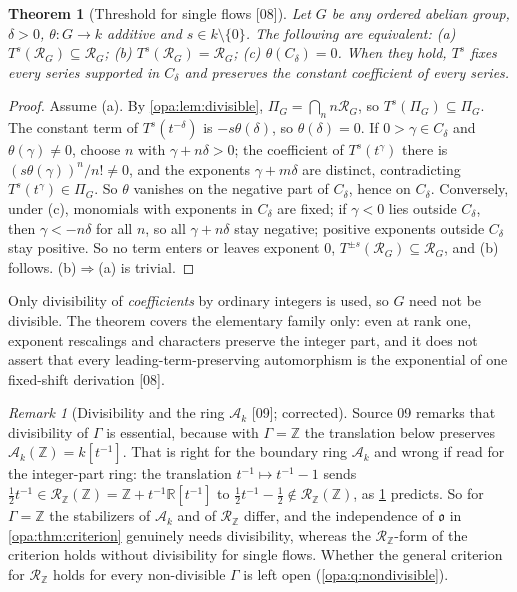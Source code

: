 \documentclass[11pt,oneside]{article}
\numberwithin{equation}{section}
\newtheorem{theorem}{Theorem}[section]
\theoremstyle{definition}
\theoremstyle{remark}
\newtheorem{remark}[remark]{Remark}
\newcommand{\R}{\mathbb R}
\newcommand{\Z}{\mathbb Z}
\newcommand{\oo}{\mathfrak o}
\newcommand{\Ak}{\mathcal A_k}
\newcommand{\src}[1]{\textup{\textsf{\small[#1]}}}
\begin{document}
\begin{theorem}[Threshold for single flows \src{08}]\label{opa:thm:threshold}
Let $G$ be any ordered abelian group, $\delta>0$, $\theta:G\to k$ additive and
$s\in k\setminus\{0\}$. The following are equivalent: \textup{(a)}
$T^s(\mathcal R_G)\subseteq\mathcal R_G$; \textup{(b)}
$T^s(\mathcal R_G)=\mathcal R_G$; \textup{(c)} $\theta(C_\delta)=0$. When they hold,
$T^s$ fixes every series supported in $C_\delta$ and preserves the constant
coefficient of every series.
\end{theorem}
\begin{proof}
Assume (a). By \cref{opa:lem:divisible}, $\Pi_G=\bigcap_nn\mathcal R_G$, so
$T^s(\Pi_G)\subseteq\Pi_G$. The constant term of $T^s(t^{-\delta})$ is
$-s\theta(\delta)$, so $\theta(\delta)=0$. If $0>\gamma\in C_\delta$ and
$\theta(\gamma)\ne0$, choose $n$ with $\gamma+n\delta>0$; the coefficient of
$T^s(t^\gamma)$ there is $(s\theta(\gamma))^n/n!\ne0$, and the exponents
$\gamma+m\delta$ are distinct, contradicting $T^s(t^\gamma)\in\Pi_G$. So $\theta$
vanishes on the negative part of $C_\delta$, hence on $C_\delta$. Conversely,
under (c), monomials with exponents in $C_\delta$ are fixed; if $\gamma<0$ lies
outside $C_\delta$, then $\gamma<-n\delta$ for all $n$, so all
$\gamma+n\delta$ stay negative; positive exponents outside $C_\delta$ stay
positive. So no term enters or leaves exponent $0$, $T^{\pm s}(\mathcal R_G)
\subseteq\mathcal R_G$, and (b) follows. (b)$\Rightarrow$(a) is trivial.
\end{proof}

Only divisibility of \emph{coefficients} by ordinary integers is used, so
$G$ need not be divisible. The theorem covers the elementary family only:
even at rank one, exponent rescalings and characters preserve the integer part,
and it does not assert that every leading-term-preserving automorphism is the
exponential of one fixed-shift derivation \src{08}.

\begin{remark}[Divisibility and the ring $\Ak$ \src{09}; corrected]\label{opa:rem:divisibility}
Source 09 remarks that divisibility of $\Gamma$ is essential, because with
$\Gamma=\Z$ the translation below preserves $\Ak(\Z)=k[t^{-1}]$. That is right
for the boundary ring $\Ak$ and wrong if read for the integer-part ring: the
translation $t^{-1}\mapsto t^{-1}-1$ sends $\tfrac12t^{-1}\in\mathcal R_\Z(\Z)=
\Z+t^{-1}\R[t^{-1}]$ to $\tfrac12t^{-1}-\tfrac12\notin\mathcal R_\Z(\Z)$, as
\cref{opa:thm:threshold} predicts. So for $\Gamma=\Z$ the stabilizers of $\Ak$ and
of $\mathcal R_\Z$ differ, and the independence of $\oo$ in
\cref{opa:thm:criterion} genuinely needs divisibility, whereas the
$\mathcal R_\Z$-form of the criterion holds without divisibility for single
flows. Whether the general criterion for $\mathcal R_\Z$ holds for every
non-divisible $\Gamma$ is left open (\cref{opa:q:nondivisible}).
\end{remark}
\end{document}
